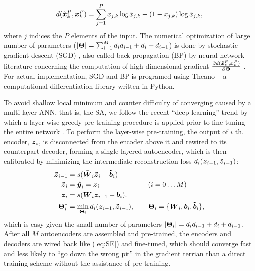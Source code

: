 \begin{align} \label{eq:CE}
  d(\boldsymbol{\tilde{x}}_k^P, \boldsymbol{x}_k^P) = \sum_{j=1}^P{x_{j,k}\log{\tilde{x}_{j,k}} + (1 - x_{j,k})\log{\tilde{x}_{j,k}}},
\end{align}
where $j$ indices the $P$ elements of the input. The numerical optimization of large number of parameters ($|\boldsymbol{\Theta}| = \sum_{i=1}^M{d_i d_{i-1} + d_i + d_{i-1}}$) is done by stochastic gradient descent (SGD) \cite{SGD1, SGD2}, also called back propagation (BP) by neural network literature concerning the computation of high dimensional gradient $\frac{\partial d(\boldsymbol{\tilde{x}}_k^P, \boldsymbol{x}_k^P)}{\partial \boldsymbol{\Theta}}$ \cite{BP1, BP2, BP3}. For actual implementation, SGD and BP is programed using Theano \cite{Theano1} -- a computational differentiation library written in Python. 

To avoid shallow local minimum and counter difficulty of converging caused by a multi-layer ANN, that is, the SA, we follow the recent ``deep learning'' trend by which a layer-wise greedy pre-training procedure is applied prior to fine-tuning the entire network \cite{DL:DBN1, DL:SDA1}. To perform the layer-wise pre-training, the output of $i$ th. encoder, $\boldsymbol{z}_i$, is disconnected from the encoder above it and rewired to its counterpart decoder, forming a single layered autoencoder, which is then calibrated by minimizing the intermediate reconstruction loss $d_i(\boldsymbol{z}_{i-1}, \boldsymbol{\tilde{z}}_{i-1})$:
\begin{equation}\label{eq:Greedy}
  \begin{split}
    \boldsymbol{\tilde{z}}_{i-1} &= s(\boldsymbol{\tilde{W}}_i \boldsymbol{\tilde{z}}_i + \boldsymbol{\tilde{b}}_i) \\
    \boldsymbol{\tilde{z}}_{i  } &= \boldsymbol{\hat{y}}_i = \boldsymbol{z}_i \quad \qquad \qquad \qquad (i = 0 \dots M) \\
    \boldsymbol{z}_{i  } &= s(\boldsymbol{W}_i\boldsymbol{z}_{i-1} + \boldsymbol{b}_i). \\
    \boldsymbol{\Theta}_i^* &= \min_{\boldsymbol{\Theta}_i}{d_i(\boldsymbol{z}_{i-1}, \boldsymbol{\tilde{z}}_{i-1})}, \qquad \boldsymbol{\Theta}_i = \{\boldsymbol{W}_i, \boldsymbol{b}_i, \boldsymbol{\tilde{b}}_i\},
  \end{split}
\end{equation}
which is easy given the small number of parameters $|\boldsymbol{\Theta}_i|=d_i d_{i-1} + d_i + d_{i-1}$. After all $M$ autoencoders are assembled and pre-trained, the encoders and decoders are wired back like (\ref{eq:SE}) and fine-tuned, which should converge fast and less likely to ``go down the wrong pit'' in the gradient terrian than a direct training scheme without the assistance of pre-training.

